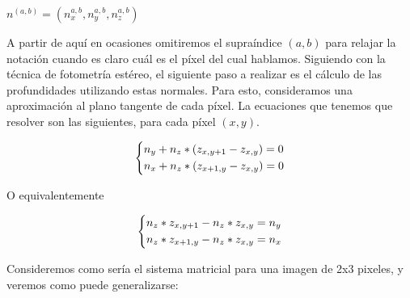 \begin{center}
$n^{(a,b)} = (n_{x}^{a,b}, n_{y}^{a,b}, n_{z}^{a,b})$
\end{center}

A partir de aquí en ocasiones omitiremos el supraíndice $(a,b)$ para relajar la notación cuando es claro cuál es el píxel del cual hablamos. Siguiendo con la técnica de fotometría estéreo, el siguiente paso a realizar es el cálculo de las profundidades utilizando estas normales. Para esto, consideramos una aproximación al plano tangente de cada píxel. La ecuaciones que tenemos que resolver son las siguientes, para cada píxel $(x ,y)$.

\begin{center}
\[
    \begin{dcases}
        n_{y} +  n_{z} * (z_{x, y+1} - z_{x, y}) = 0 \\
        n_{x} +  n_{z} * (z_{x+1, y} - z_{x, y}) = 0
    \end{dcases}
\]
\end{center}
O equivalentemente
\begin{center}
\[\begin{dcases}
        n_{z} * z_{x, y+1} - n_{z} *  z_{x, y} = n_{y}  \\
        n_{z} * z_{x+1, y} - n_{z} *  z_{x, y} = n_{x}
    \end{dcases}
\]
\end{center}

Consideremos como sería el sistema matricial para una imagen de 2x3 pixeles, y veremos como puede generalizarse: \\


